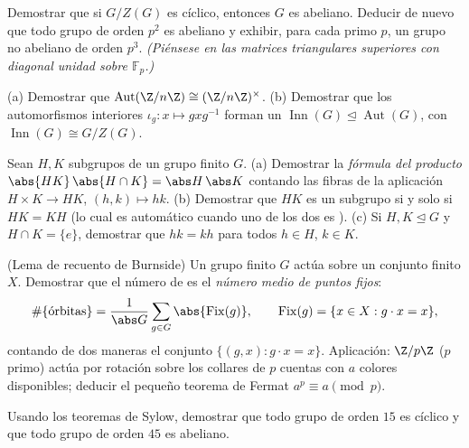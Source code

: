 \begin{exercise}[$\star$]\label{exo:b3:groups:2}
Demostrar que si $G/Z(G)$ es cíclico, entonces $G$ es abeliano. Deducir
de nuevo que todo grupo de orden $p^2$ es abeliano y exhibir, para cada
primo $p$, un grupo no abeliano de orden $p^3$. \emph{(Piénsese en las
matrices triangulares superiores con diagonal unidad sobre
$\mathbb F_p$.)}
\end{exercise}

\begin{exercise}[$\star$]\label{exo:b3:groups:3}
(a) Demostrar que $\operatorname{Aut}(\Z/n\Z) \cong (\Z/n\Z)^\times$.
(b) Demostrar que los automorfismos interiores $\iota_g \colon x \mapsto
gxg^{-1}$ forman un 
$\operatorname{Inn}(G)
\trianglelefteq \operatorname{Aut}(G)$, con
$\operatorname{Inn}(G) \cong G/Z(G)$.
\end{exercise}

\begin{exercise}[$\star\star$]\label{exo:b3:groups:4}
Sean $H, K$ subgrupos de un grupo finito $G$. (a) Demostrar la
\emph{fórmula del producto} $\abs{HK}\,\abs{H\cap K} =
\abs H\, \abs K$ contando las fibras de la aplicación $H \times K
\to HK$, $(h,k) \mapsto hk$. (b) Demostrar que $HK$ es un subgrupo si y
solo si $HK = KH$ (lo cual es automático cuando uno de los dos es
). (c) Si $H, K \trianglelefteq G$
y $H \cap K = \{e\}$, demostrar que $hk = kh$ para todos $h \in H$,
$k \in K$.
\end{exercise}

\begin{exercise}[$\star\star$]\label{exo:b3:groups:5}
(Lema de recuento de Burnside) Un grupo finito $G$ actúa sobre un
conjunto finito $X$. Demostrar que el número de
 es el \emph{número medio de
puntos fijos}:
\[
\#\{\text{órbitas}\} = \frac{1}{\abs G}\sum_{g \in G}
\abs{\operatorname{Fix}(g)},
\qquad \operatorname{Fix}(g) = \{x \in X : g \cdot x = x\},
\]
contando de dos maneras el conjunto $\{(g,x) : g\cdot x = x\}$.
Aplicación: $\Z/p\Z$ ($p$ primo) actúa por rotación sobre los collares
de $p$ cuentas con $a$ colores disponibles; deducir el pequeño teorema
de Fermat $a^p \equiv a \pmod p$.
\end{exercise}

\begin{exercise}[$\star$]\label{exo:b3:groups:6}
Usando los teoremas de Sylow, demostrar que todo grupo de orden $15$ es
cíclico y que todo grupo de orden $45$ es abeliano.
\end{exercise}

